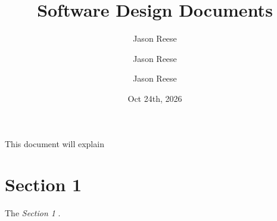 \documentclass{article}
\begin{document}
\title{Software Design Documents}
\author{Jason Reese}
\author{Jason Reese}
\author{Jason Reese}
\date{Oct 24th, 2026}

\maketitle

\fancyhf{}
\fancyfoot[C]{\thepage}

\maketitle %
\tableofcontents
\newpage %

This document will explain 

\section{Section 1}
The \textit{Section 1} .
\end{document}
